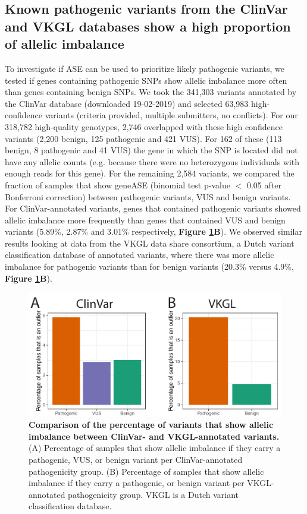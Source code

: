 {{\subsection{Known pathogenic variants from the ClinVar and VKGL databases show a high proportion of allelic imbalance}
To investigate if ASE can be used to prioritize likely pathogenic variants, we tested if genes containing pathogenic SNPs show allelic imbalance more often than genes containing benign SNPs. We took the 341,303 variants annotated by the ClinVar database (downloaded 19-02-2019) and selected 63,983 high-confidence variants (criteria provided, multiple submitters, no conflicts). For our 318,782 high-quality genotypes, 2,746 overlapped with these high confidence variants (2,200 benign, 125 pathogenic and 421 VUS). For 162 of these (113 benign, 8 pathogenic and 41 VUS) the gene in which the SNP is located did not have any allelic counts (e.g. because there were no heterozygous individuals with enough reads for this gene). For the remaining 2,584 variants, we compared the fraction of samples that show geneASE (binomial test p-value $<$ 0.05 after Bonferroni correction) between pathogenic variants, VUS and benign variants. For ClinVar-annotated variants, genes that contained pathogenic variants showed allelic imbalance more frequently than genes that contained VUS and benign variants (5.89\%, 2.87\% and 3.01\% respectively, \textbf{Figure \ref{ase_fig2}B})\cite{landrumClinVarImprovingAccess2018}. We observed similar results looking at data from the VKGL data share consortium\cite{fokkemaDutchGenomeDiagnostic2019}, a Dutch variant classification database of annotated variants, where there was more allelic imbalance for pathogenic variants than for benign variants (20.3\% versus 4.9\%, \textbf{Figure \ref{ase_fig2}B}). 

\begin{figure}[h!]
	\includegraphics[width=\textwidth]{chapters/chapter3-allele-specific-expression/img/fig2.pdf}
	\caption{\textbf{Comparison of the percentage of variants that show allelic imbalance between ClinVar- and VKGL-annotated variants.} (A) Percentage of samples that show allelic imbalance if they carry a pathogenic, VUS, or benign variant per ClinVar-annotated pathogenicity group. (B) Percentage of samples that show allelic imbalance if they carry a pathogenic, or benign variant per VKGL-annotated pathogenicity group. VKGL is a Dutch variant classification database. }
	\label{ase_fig2}
\end{figure}


}}
